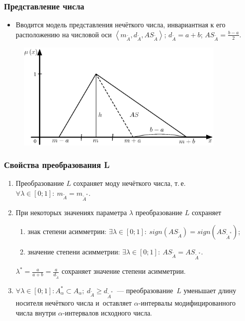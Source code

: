 \documentclass[12pt]{beamer}
\begin{document}

\begin{frame}
  \frametitle{Представление числа}
  \begin{itemize}
    \item Вводится модель представления нечёткого числа, инвариантная к его расположению на числовой оси  $\left\langle m_{\tilde A}, d_{\tilde A}, AS_{\tilde A} \right\rangle$; $d_{\tilde A} = a+b$; $\displaystyle AS_{\tilde A} = \frac{b-a}{2}$.
  \end{itemize}
  \begin{figure}[h]
    \includegraphics[width=0.9\textwidth]{as-degree}
  \end{figure}
\end{frame}


\begin{frame}
  \frametitle{Свойства преобразования L}
  \begin{enumerate}
    \item Преобразование $L$ сохраняет моду нечёткого числа, т.\,е. $\forall \lambda \in \left[ 0;1 \right]:\ m_{\tilde A}=m_{\tilde A^{*}}$.
    \item При некоторых значениях параметра $\lambda$ преобразование $L$ сохраняет
      \begin{enumerate}
        \item знак степени асимметрии: $\exists \lambda \in [0;1]:\ sign(AS_{\tilde A})=sign(AS_{\tilde A^{*}})$;
        \item значение степени асимметрии: $\exists \lambda \in [0;1]:\ AS_{\tilde A}=AS_{\tilde A^{*}}$.
      \end{enumerate}
      $\displaystyle \lambda^* =\frac{a}{a+b}=\frac{a}{d_{\tilde A}}$ сохраняет значение степени асимметрии.
    \item $\forall \lambda \in \left[ 0;1 \right]: A_{\alpha}^{*}\subset A_\alpha;\ d_{\tilde A} \geqslant d_{\tilde A^{*}}$~--- преобразование~$L$ уменьшает длину носителя нечёткого числа и~оставляет $\alpha$-интервалы модифицированного числа внутри $\alpha$-интервалов исходного числа.
  \end{enumerate}
\end{frame}
\end{document}
